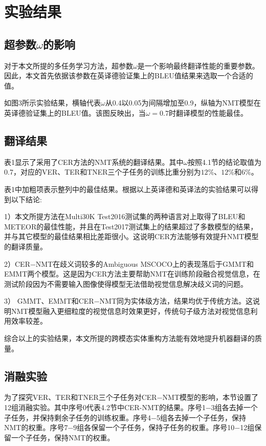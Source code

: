 \section{实验结果}

\subsection{超参数$\omega$的影响}
对于本文所提的多任务学习方法，超参数$\omega$是一个影响最终翻译性能的重要参数。因此，本文首先依据该参数在英译德验证集上的BLEU值结果来选取一个合适的值。

如图3所示实验结果，横轴代表$\omega$从0.4以0.05为间隔增加至0.9，纵轴为NMT模型在英译德验证集上的BLEU值。该图反映出，当$\omega=0.7$时翻译模型的性能最佳。


\subsection{翻译结果}
表1显示了采用了CER方法的NMT系统的翻译结果。其中$\omega$按照4.1节的结论取值为0.7，对应的VER、TER和TNER三个子任务的训练比重分别为$12\%$、$12\%$和$6\%$。


表1中加粗项表示整列中的最佳结果。根据以上英译德和英译法的实验结果可以得到以下结论:

1）本文所提方法在Multi30K Test2016测试集的两种语言对上取得了BLEU和METEOR的最佳性能，并且在Test2017测试集上的结果超过了多数模型的结果，并与其它模型的最佳结果相比差距很小。这说明CER方法能够有效提升NMT模型的翻译质量。

2）CER$-$NMT在歧义词较多的Ambiguous MSCOCO上的表现落后于GMMT和EMMT两个模型。这是因为CER方法主要帮助NMT在训练阶段融合视觉信息，在测试阶段因为不需要输入图像使得模型无法借助视觉信息解决歧义词的问题。

3）%
GMMT、EMMT和CER$-$NMT同为实体级方法，结果均优于传统方法。这说明NMT模型融入更细粒度的视觉信息时效果更好，传统句子级方法对视觉信息利用效率较差。

综合以上的实验结果，本文所提的跨模态实体重构方法能有效地提升机器翻译的质量。

\subsection{消融实验}
为了探究VER、TER和TNER三个子任务对CER$-$NMT模型的影响，本节设置了12组消融实验。其中序号0代表4.2节中CER-NMT的结果。序号1$-$3组各去掉一个子任务，并保持剩余子任务的训练权重。序号4$-$5组各去掉一个子任务，保持NMT的权重。序号7$-$9组各保留一个子任务，保持子任务的权重。序号10$-$12组保留一个子任务，保持NMT的权重。

